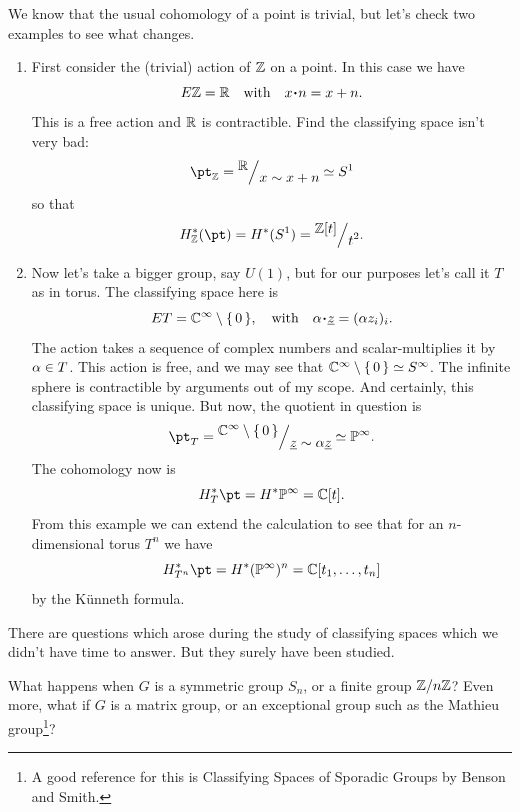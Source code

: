 \documentclass[12pt]{memoir}
\begin{document}
\begin{Ex}
We know that the usual cohomology of a point is trivial, but let's check two examples to see what changes.
\begin{enumerate}
    \item First consider the (trivial) action of $\mathbb{Z}$ on a point. In this case we have
    $$E\bZ=\bR\word{with}x\.n=x+n.$$
    This is a free action and $\mathbb{R}$ is contractible. Find the classifying space isn't very bad:
    $$\pt_\bZ=\quot{\bR}{x\sim x+n}\isom S^1$$
    so that 
    $$H_\bZ^\ast(\pt)=H^\ast(S^1)=\quot{\bZ[t]}{t^2}.$$
    \item Now let's take a bigger group, say $U(1)$, but for our purposes let's call it $T$ as in torus. The classifying space here is 
    $$ET=\bC^\infty\less\set{0},\word{with}\al\.\un{z}=(\al z_i)_i.$$
    The action takes a sequence of complex numbers and scalar-multiplies it by $\alpha\in T$. 
    This action is free, and we may see that $\mathbb{C}^\infty\setminus\{\,0\,\}\simeq S^\infty$. The infinite sphere is contractible by arguments out of my scope. And certainly, this classifying space is unique. But now, the quotient in question is 
    $$\pt_T=\quot{\bC^\infty\less\set{0}}{\un{z}\sim \al\un{z}}\isom\bP^\infty.$$
    The cohomology now is 
    $$H^\ast_{T}\pt=H^\ast\bP^\infty=\bC[t].$$
    From this example we can extend the calculation to see that for an $n$-dimensional torus $T^n$ we have 
    $$H^\ast_{T^n}\pt=H^\ast(\bP^\infty)^n=\bC[t_1,\dots,t_n]$$
    by the K\"unneth formula.
\end{enumerate}
\end{Ex}

There are questions which arose during the study of classifying spaces which we didn't have time to answer. But they surely have been studied.

\begin{Qn}
    What happens when $G$ is a symmetric group $S_n$, or a finite group $\mathbb{Z}/n\mathbb{Z}$? Even more, what if $G$ is a matrix group, or an exceptional group such as the Mathieu group\footnote{A good reference for this is Classifying Spaces of Sporadic Groups by Benson and Smith.}?  
\end{Qn}
\end{document}
